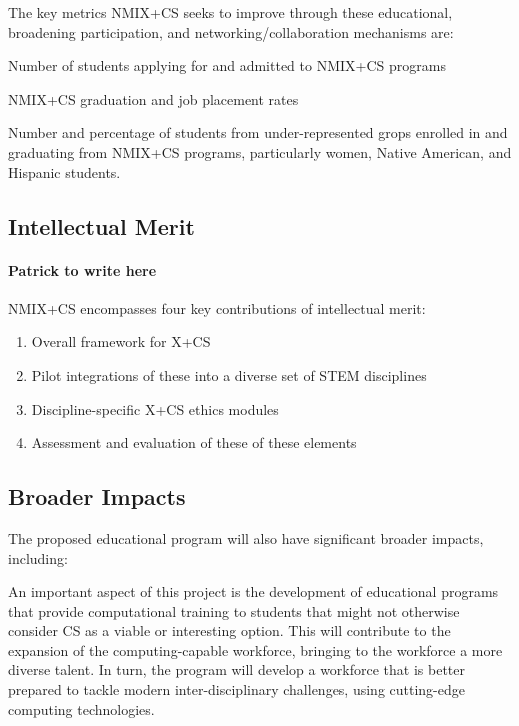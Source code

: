 The key metrics NMIX+CS seeks to improve through these educational, broadening participation, and networking/collaboration mechanisms are:
\begin{tightitemize}
\item Number of students applying for and admitted to NMIX+CS programs
\item NMIX+CS graduation and job placement rates
\item Number and percentage of students from under-represented grops enrolled in and 
  graduating from NMIX+CS programs, particularly women, Native American, and Hispanic students.
\end{tightitemize} 

\subsection{Intellectual Merit} 
\paragraph{Patrick to write here}
NMIX+CS encompasses four key contributions of intellectual merit:
\begin{enumerate}
\item Overall framework for X+CS 
\item Pilot integrations of these into a diverse set of STEM disciplines
\item Discipline-specific X+CS ethics modules 
\item Assessment and evaluation of these of these elements
\end{enumerate}

\subsection{Broader Impacts} 
The proposed educational program will also have significant broader impacts, including:

An important aspect of this project is the development of educational programs that provide computational training to students that might not otherwise consider CS as a viable or interesting option. This will contribute to the expansion of the computing-capable workforce, bringing to the workforce a more diverse talent. In turn, the program will develop a workforce that is better prepared to tackle modern inter-disciplinary challenges, using cutting-edge computing technologies.

